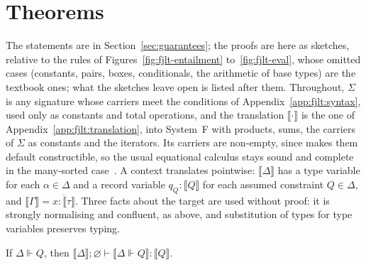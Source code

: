 \section{Theorems}
\label{app:fjlt:theorems}

The statements are in Section~\ref{sec:guarantees}; the proofs are here as sketches, relative to the rules of Figures~\ref{fig:fjlt-entailment} to~\ref{fig:fjlt-eval}, whose omitted cases (constants, pairs, boxes, conditionals, the arithmetic of base types) are the textbook ones; what the sketches leave open is listed after them.
Throughout, $\Sigma$ is any signature whose carriers meet the conditions of Appendix~\ref{app:fjlt:syntax}, used only as constants and total operations, and the translation $\llbracket \cdot \rrbracket$ is the one of Appendix~\ref{app:fjlt:translation}, into System~F with products, sums, the carriers of $\Sigma$ as constants and the iterators.
Its carriers are non-empty, since \RuleOne{} makes them default constructible, so the usual equational calculus stays sound and complete in the many-sorted case~\cite{goguen1985completeness}.
A context translates pointwise: $\llbracket \Delta \rrbracket$ has a type variable for each $\alpha \in \Delta$ and a record variable $q_Q : \llbracket Q \rrbracket$ for each assumed constraint $Q \in \Delta$, and $\llbracket \Gamma \rrbracket = \overline{x : \llbracket \tau \rrbracket}$.
Three facts about the target are used without proof: it is strongly normalising and confluent, as above, and substitution of types for type variables preserves typing.

\begin{lemma}
\label{lem:dict}
If $\Delta \Vdash Q$, then $\llbracket \Delta \rrbracket; \varnothing \vdash \llbracket \Delta \Vdash Q \rrbracket : \llbracket Q \rrbracket$.
\end{lemma}

